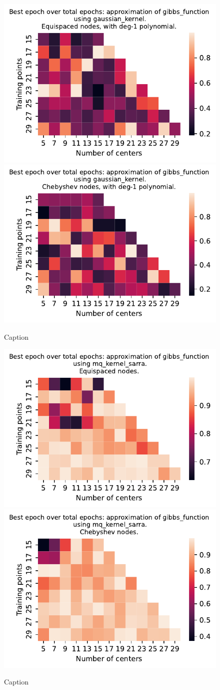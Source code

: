 \documentclass[12pt]{report} %
\begin{document}
\begin{figure}[ht]
    \centering
    
    \includegraphics[width=.49\textwidth]{imagenes/experiments/1d/variational_epochs/gibbs_function-Kgaussian_kernel-Poly-Equi-epochs.pdf}
    \includegraphics[width=.49\textwidth]{imagenes/experiments/1d/variational_epochs/gibbs_function-Kgaussian_kernel-Poly-Cheb-epochs.pdf}
    \caption{Caption}
    \label{fig:epochs-gibbs-gaussian-poly}
\end{figure}

\begin{figure}[ht]
    \centering
    
    \includegraphics[width=.49\textwidth]{imagenes/experiments/1d/variational_epochs/gibbs_function-Kmq_kernel_sarra-Equi-epochs.pdf}
    \includegraphics[width=.49\textwidth]{imagenes/experiments/1d/variational_epochs/gibbs_function-Kmq_kernel_sarra-Cheb-epochs.pdf}
    \caption{Caption}
    \label{fig:epochs-gibbs-sarra}
\end{figure}
\end{document}
